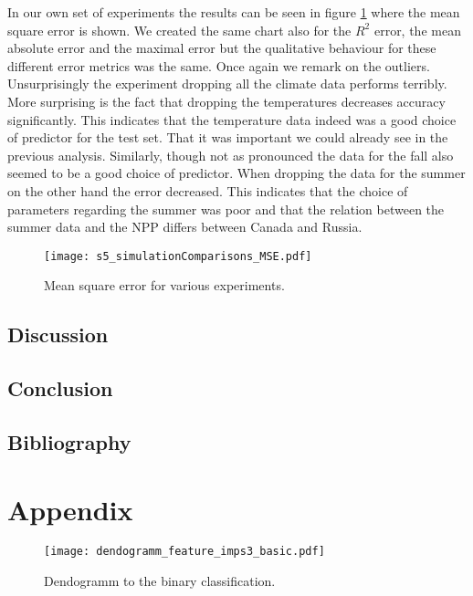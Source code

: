 In our own set of experiments the results can be seen in figure \ref{pl:s5_simulationComparisons_MSE} where the mean square error
is shown. We created the same chart also for the $R^2$ error, the mean absolute error and the maximal error but the qualitative behaviour
for these different error metrics was the same.
Once again we remark on the outliers. Unsurprisingly the experiment dropping all the climate data performs terribly.
More surprising is the fact that dropping the temperatures decreases accuracy significantly. This
indicates that the temperature data indeed was a good choice of predictor for the test set. That it was important
we could already see in the previous analysis. Similarly,
though not as pronounced the data for the fall also seemed to be a good choice of predictor.
When dropping the data for the summer on the other hand the error decreased. This indicates that the choice of parameters
regarding the summer was poor and that the relation between the summer data and the NPP differs between Canada and Russia.
\begin{figure}[h]
  \centering
  \begin{minipage}{0.45\textwidth}
    \centering
    \texttt{[image: s5\_simulationComparisons\_MSE.pdf]}
    \caption{Mean square error for various experiments.}
    \label{pl:s5_simulationComparisons_MSE}
  \end{minipage}
\end{figure}

\section{Discussion}

\newpage
\section{Conclusion}


\section*{Bibliography}
\nocite{*}
\printbibliography[heading=none, keyword={secondary}]

\pagebreak
\chapter*{Appendix}
\begin{figure}
  \centering
  \texttt{[image: dendogramm\_feature\_imps3\_basic.pdf]}
  \caption{Dendogramm to the binary classification.}
  \label{pl:dendogramm_feature_imps3_basic}
\end{figure}


